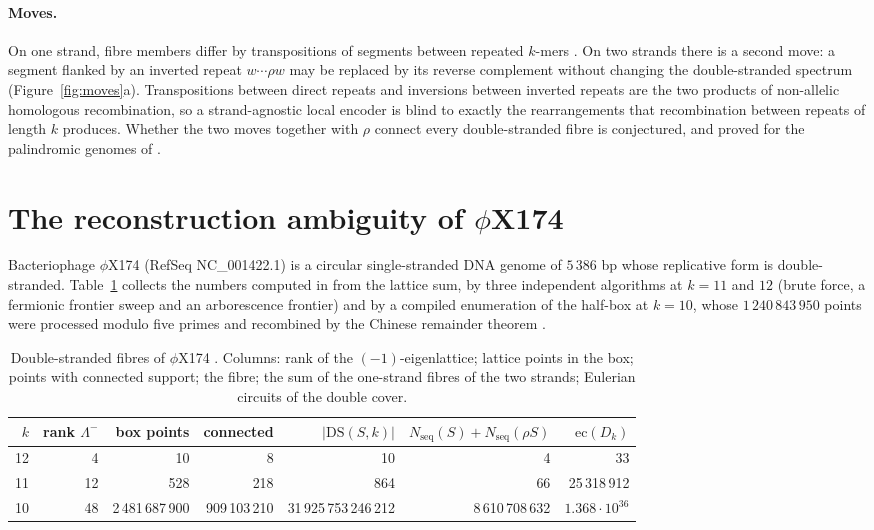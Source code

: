 \documentclass[11pt]{article}
\theoremstyle{plain}
\theoremstyle{definition}
\theoremstyle{remark}
\newcommand{\DS}{\mathrm{DS}}
\begin{document}
\paragraph{Moves.} On one strand, fibre members differ by transpositions of segments between repeated
$k$-mers \cite{Ukk92,Pev95}. On two strands there is a second move: a segment flanked by an inverted repeat
$w\cdots\rho w$ may be replaced by its reverse complement without changing the double-stranded spectrum
\cite[Thm.~11.1]{AG} (Figure~\ref{fig:moves}a). Transpositions between direct repeats and inversions between inverted repeats are the two
products of non-allelic homologous recombination, so a strand-agnostic local encoder is blind to exactly the
rearrangements that recombination between repeats of length $k$ produces. Whether the two moves together with
$\rho$ connect every double-stranded fibre is conjectured, and proved for the palindromic genomes of
\cite[Ch.~10--11]{AG}.

\section{The reconstruction ambiguity of \texorpdfstring{$\phi$}{phi}X174}\label{sec:phix}

Bacteriophage $\phi$X174 (RefSeq NC\_001422.1) is a circular single-stranded DNA genome of $5\,386$ bp whose
replicative form is double-stranded. Table~\ref{tab:phix} collects the numbers computed in \cite{AG} from the
lattice sum, by three independent algorithms at $k=11$ and $12$ (brute force, a fermionic frontier sweep and an
arborescence frontier) and by a compiled enumeration of the half-box at $k=10$, whose $1\,240\,843\,950$ points
were processed modulo five primes and recombined by the Chinese remainder theorem
\cite[Ch.~8--9]{AG}.

\begin{table}[t]
\centering\small
\begin{tabular}{rrrrrrr}
\toprule
$k$ & rank $\Lambda^-$ & box points & connected & $|\DS(S,k)|$ & $N_{\mathrm{seq}}(S)+N_{\mathrm{seq}}(\rho S)$ & $\mathrm{ec}(D_k)$\\
\midrule
12 & 4 & 10 & 8 & 10 & 4 & 33\\
11 & 12 & 528 & 218 & 864 & 66 & 25\,318\,912\\
10 & 48 & 2\,481\,687\,900 & 909\,103\,210 & 31\,925\,753\,246\,212 & 8\,610\,708\,632 & $1.368\cdot10^{36}$\\
\bottomrule
\end{tabular}
\caption{Double-stranded fibres of $\phi$X174 \cite[Tables of Ch.~7--9]{AG}. Columns: rank of the
$(-1)$-eigenlattice; lattice points in the box; points with connected support; the fibre; the sum of the
one-strand fibres of the two strands; Eulerian circuits of the double cover.}\label{tab:phix}
\end{table}
\end{document}
